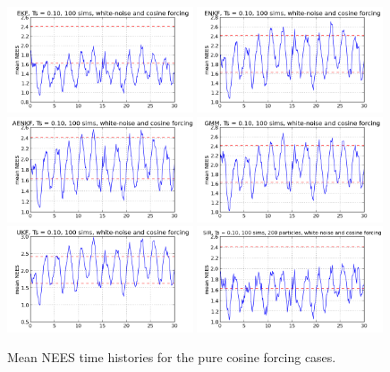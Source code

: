 \documentclass[]{article}
\begin{document}
\begin{figure}[p!]
\centering
\includegraphics[width=0.49\textwidth]{../../challenge_problem/trials/nees_ekf_sims_11_medium}
\includegraphics[width=0.49\textwidth]{../../challenge_problem/trials/nees_enkf_sims_11_medium}
\includegraphics[width=0.49\textwidth]{../../challenge_problem/trials/nees_aenkf_sims_11_medium}
\includegraphics[width=0.49\textwidth]{../../challenge_problem/trials/nees_gmm_sims_11_medium}
\includegraphics[width=0.49\textwidth]{../../challenge_problem/trials/nees_ukf_sims_11_medium}
\includegraphics[width=0.49\textwidth]{../../challenge_problem/trials/nees_sir_200_sims_11_medium}
\caption{Mean NEES time histories for the pure cosine forcing cases.}
\label{fig:nees_11_medium}
\end{figure}
\end{document}
